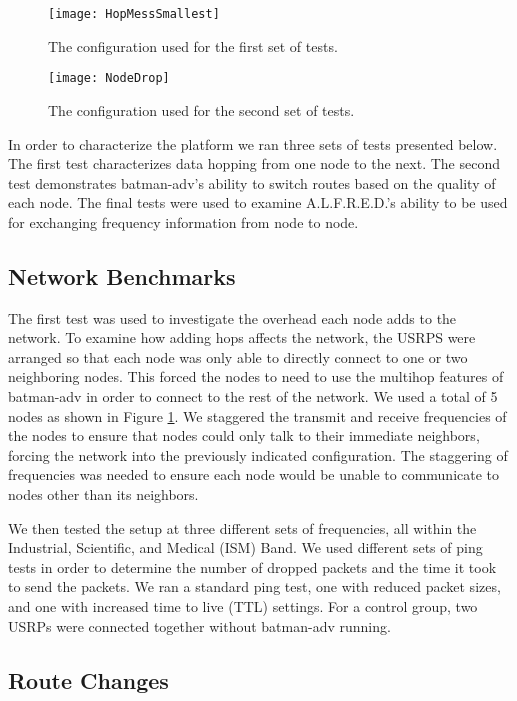 \begin{figure}
	\centering
	\texttt{[image: HopMessSmallest]}
	\caption{The configuration used for the first set of tests. \cite{selfpaper}}
	\label{fig:HopMess}
\end{figure}

\begin{figure}
	\centering
	\texttt{[image: NodeDrop]}
	\caption{The configuration used for the second set of tests. \cite{selfpaper}}
	\label{fig:NodeDrop}
\end{figure}

In order to characterize the platform we ran three sets of tests presented below. The first test characterizes data hopping from one node to the next. The second test demonstrates batman-adv's ability to switch routes based on the quality of each node. The final tests were used to examine A.L.F.R.E.D.'s ability to be used for exchanging frequency information from node to node. 

\subsection{Network Benchmarks}

The first test was used to investigate the overhead each node adds to the network. To examine how adding hops affects the network, the USRPS were arranged so that each node was only able to directly connect to one or two neighboring nodes. This forced the nodes to need to use the multihop features of batman-adv in order to connect to the rest of the network. We used a total of 5 nodes as shown in Figure \ref{fig:HopMess}. We staggered the transmit and receive frequencies of the nodes to ensure that nodes could only talk to their immediate neighbors, forcing the network into the previously indicated configuration. The staggering of frequencies was needed to ensure each node would be unable to communicate to nodes other than its neighbors. 

 We then tested the setup at three different sets of frequencies, all within the Industrial, Scientific, and Medical (ISM) Band. We used different sets of ping tests in order to determine the number of dropped packets and the time it took to send the packets. We ran a standard ping test, one with reduced packet sizes, and one with increased time to live (TTL) settings. For a control group, two USRPs were connected together without batman-adv running. 


\subsection{Route Changes}

